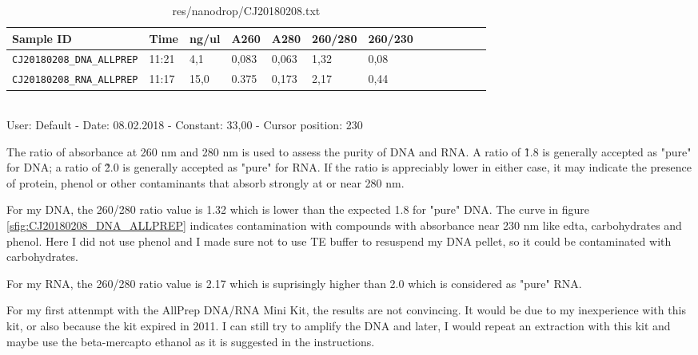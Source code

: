 \begin{table}[htbp]
\caption{res/nanodrop/CJ20180208.txt}
\label{tab:CJ20180208}
\centering
\begin{tabular}{l l l l l l l l l l l l l }
\toprule
Sample ID & Time  & ng/ul  & A260  & A280  & 260/280  & 260/230  \\ \midrule
\texttt{CJ20180208\_DNA\_ALLPREP} & 11:21 & 4,1 & 0,083 & 0,063 & 1,32 & 0,08  \\
\texttt{CJ20180208\_RNA\_ALLPREP} & 11:17 & 15,0 & 0.375 & 0,173 & 2,17 & 0,44 \\
\bottomrule
\end{tabular}
\\
User: Default - Date: 08.02.2018 - Constant: 33,00 - Cursor position: 230 \
\end{table}

The ratio of absorbance at 260 nm and 280 nm is used to assess the purity of DNA and RNA. A ratio of \~1.8 is generally accepted as "pure" for DNA; a ratio of \~2.0 is generally accepted as "pure" for RNA. If the ratio is appreciably lower in either case, it may indicate the presence of protein, phenol or other contaminants that absorb strongly at or near 280 nm.

For my DNA, the 260/280 ratio value is 1.32 which is lower than the expected 1.8 for "pure" DNA. The curve in figure \ref{sfig:CJ20180208_DNA_ALLPREP} indicates contamination with compounds with absorbance near 230 nm like \gls{edta}, carbohydrates and phenol. Here I did not use phenol and I made sure not to use TE buffer to resuspend my DNA pellet, so it could be contaminated with carbohydrates.

For my RNA, the 260/280 ratio value is 2.17 which is suprisingly higher than 2.0 which is considered as "pure" RNA.

For my first attenmpt with the AllPrep DNA/RNA Mini Kit, the results are not convincing. It would be due to my inexperience with this kit, or also because the kit expired in 2011. I can still try to amplify the DNA and later, I would repeat an extraction with this kit and maybe use the beta-mercapto ethanol as it is suggested in the instructions.


